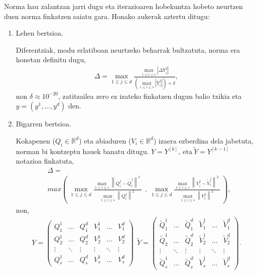 Norma hau zalantzan jarri dugu eta iterazioaren hobekuntza hobeto neurtzen duen norma finkatzen saiatu gara. Honako aukerak aztertu ditugu:
\begin{enumerate}
\item Lehen bertsioa.

Diferentziak, modu erlatiboan neurtzeko beharrak bultzatuta, norma era honetan definitu dugu,
\begin{align*}
\Delta=\max_{1 \leqslant j \leqslant d} \frac{\max_{1 \leqslant i \leqslant s} |\Delta Y_i^j|}
                                                {(\max_{1 \leqslant i \leqslant s}|Y_i^j|)+\delta},
\end{align*}
non $\delta \approx 10^{-20}$, zatitzailea zero ez izateko finkatzen dugun balio txikia  eta $y=(y^1,\dots,y^d)$ den.

\item Bigarren bertsioa.

Kokapenen ($Q_i \in \mathbb{R}^d$) eta abiaduren ($V_i \in \mathbb{R}^d$) izaera ezberdina dela jabetuta, norman bi kontzeptu hauek banatu ditugu. $Y=Y^{[k]}, \ \text{eta} \ \tilde Y=Y^{[k-1]}$ notazioa finkatuta,
\begin{align*}
 & \Delta =\\
 & max\left({\  {\max_{1\le j\le d} \frac{{\max_{1\le i\le s} {\left\|Q^{j}_i-{\tilde{Q}}^{j}_i\right\|}^2\ }}{{\max_{1\le i\le s} {\left\|Q^{j}_i\right\|}^2\ }}\ }\ },\ {\max_{1\le j\le d} \frac{{\max_{1\le i\le s} {\left\|V^{j}_i-{\tilde{V}}^{j}_i\right\|}^2\ }}{{\max_{1\le i\le s} {\left\|V^{j}_i\right\|}^2\ }}\ }\right),
\end{align*}
non, 
\begin{align*}
Y=\left( \begin{array}{cccccc}
Q^{1}_1 & \dots  & Q^{d}_1 & V^{1}_1 & \dots  & V^{d}_1 \\ 
Q^{1}_2 & \dots  & Q^{d}_2 & V^{1}_2 & \dots  & V^{d}_2 \\ 
\vdots  & \ddots  & \vdots  & \vdots  & \ddots  & \vdots  \\ 
Q^{1}_s & \dots  & Q^{d}_s & V^{1}_s & \dots  & V^{d}_s \end{array}
\right)\ \  
\tilde Y=\left( \begin{array}{cccccc}
\tilde Q^{1}_1 & \dots  & \tilde Q^{d}_1 & \tilde V^{1}_1 & \dots  & \tilde V^{d}_1 \\ 
\tilde Q^{1}_2 & \dots  & \tilde Q^{d}_2 & \tilde V^{1}_2 & \dots  & \tilde V^{d}_2 \\ 
\vdots  & \ddots  & \vdots  & \vdots  & \ddots  & \vdots  \\ 
\tilde Q^{1}_s & \dots  & \tilde Q^{d}_s & \tilde V^{1}_s & \dots  & \tilde V^{d}_s \end{array}
\right). 
\end{align*}


\end{enumerate}
